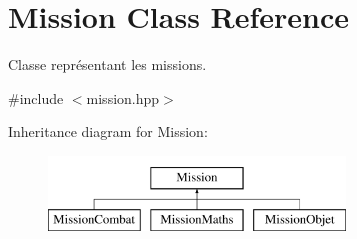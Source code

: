 \hypertarget{class_mission}{\section{Mission Class Reference}
\label{class_mission}
}


Classe représentant les missions.  




{\ttfamily \#include $<$mission.\-hpp$>$}

Inheritance diagram for Mission\-:\begin{figure}[H]
\begin{center}
\leavevmode
\includegraphics[height=2.000000cm]{class_mission}
\end{center}
\end{figure}

